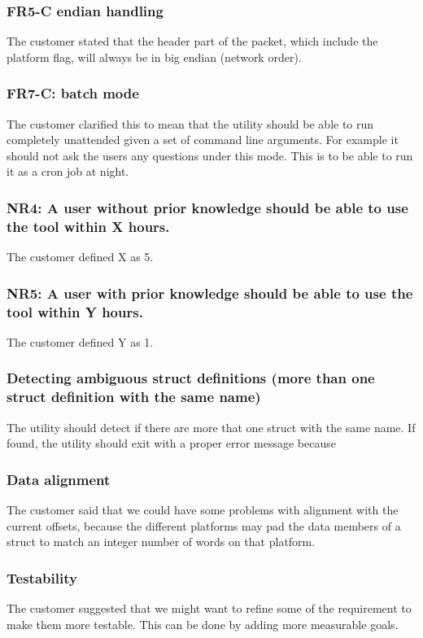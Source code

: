 \subsubsection{FR5-C \Gls{endian} handling}
The customer stated that the \gls{header} part of the \gls{packet}, which include the platform flag, will always be in big \gls{endian} (network order).

\subsubsection{FR7-C: \Gls{batch mode}}
The customer clarified this to mean that the \gls{utility} should be able to run completely unattended given a set of command line arguments. For example it should not ask the users any questions under this mode. This is to be able to run it as a \gls{cron} job at night.

\subsubsection{NR4: A user without prior knowledge should be able to use the tool within X hours.}
The customer defined X as 5.

\subsubsection{NR5: A user with prior knowledge should be able to use the tool within Y hours.}
The customer defined Y as 1.

\subsubsection{Detecting ambiguous \gls{struct} definitions (more than one \gls{struct} definition with the same name)}
The \gls{utility} should detect if there are more that one \gls{struct} with the same name. If found, the \gls{utility} should exit with a proper error message because 

\subsubsection{Data alignment}
The customer said that we could have some problems with alignment with the current offsets, because the different platforms may pad the data \glspl{member} of a \gls{struct} to match an \gls{integer} number of words on that platform.

\subsubsection{Testability}
The customer suggested that we might want to refine some of the requirement to make them more testable. This can be done by adding more measurable goals.

